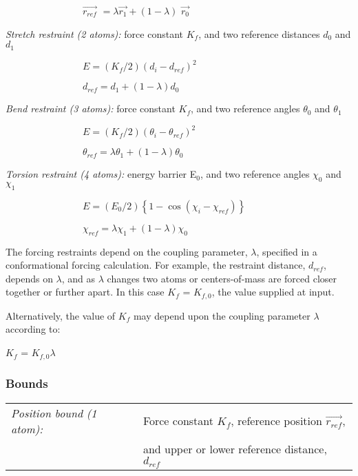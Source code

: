 $\qquad \qquad \qquad \qquad \overrightarrow{r_{ref}}$ $=\lambda 
\overrightarrow{r_{1}}+\left( 1-\lambda \right) $ $\overrightarrow{r_{0}}$

{\em Stretch restraint (2 atoms):} force constant $K_{f}$, and two reference
distances $d_{0}$ and $d_{1}$

$\qquad \qquad \qquad \qquad E=\left( K_{f}/2\right) \left(
d_{i}-d_{ref}\right) ^{2}$

$\qquad \qquad \qquad \qquad d_{ref}=d_{1}+\left( 1-\lambda \right) d_{0}$

{\em Bend restraint (3 atoms):} force constant $K_{f}$, and two reference
angles $\theta _{0}$ and $\theta _{1}$

$\qquad \qquad \qquad \qquad E=\left( K_{f}/2\right) \left( \theta
_{i}-\theta _{ref}\right) ^{2}$

$\qquad \qquad \qquad \qquad \theta _{ref}=\lambda \theta _{1}+\left(
1-\lambda \right) \theta _{0}$

{\em Torsion restraint (4 atoms):} energy barrier E$_{0}$, and two reference
angles $\chi _{0}$ and $\chi _{1}$

$\qquad \qquad \qquad \qquad E=\left( E_{0}/2\right) \left\{ 1-\cos \left(
\chi _{i}-\chi _{ref}\right) \right\} $

$\qquad \qquad \qquad \qquad \chi _{ref}=\lambda \chi _{1}+\left( 1-\lambda
\right) \chi _{0}$

The forcing restraints depend on the coupling parameter, $\lambda $,
specified in a conformational forcing calculation. For example, the
restraint distance, $d_{ref}$, depends on $\lambda $, and as $\lambda $
changes two atoms or centers-of-mass are forced closer together or further
apart. In this case $K_{f}$ = $K_{f,0}$, the value supplied at input.

Alternatively, the value of $K_{f}$ may depend upon the coupling parameter $%
\lambda $ according to:

$K_{f}$ = $K_{f,0}$\pagebreak $\lambda $

\subsubsection{Bounds}

\begin{tabular}{ll}
{\em Position bound (1 atom):} & Force constant $K_{f}$, reference position $%
\overrightarrow{r_{ref}}$, \\ 
& and upper or lower reference distance, $d_{ref}$%
\end{tabular}

